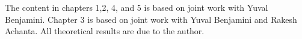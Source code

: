 \documentclass[12pt]{report}
\begin{document}
The content in chapters 1,2, 4, and 5 is based on joint work with
Yuval Benjamini.  Chapter 3 is based on joint work with Yuval
Benjamini and Rakesh Achanta.  All theoretical results are due to the
author.

    \afterpreface


 

 
 
 


\appendix %



%
%

%

 

\printbibliography[heading=bibintoc]
\end{document}
